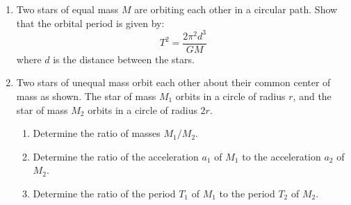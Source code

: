\documentclass{../../../oss-apphys}
\begin{document}
\begin{enumerate}[leftmargin=15pt]
\item Two stars of equal mass $M$ are orbiting each other in a circular path.
  Show that the orbital period is given by:
  \begin{displaymath}
    T^2=\frac{2\pi^2d^3}{GM}
  \end{displaymath}
  where $d$ is the distance between the stars.
  
\item Two stars of unequal mass orbit each other about their common center of
  mass as shown. The star of mass $M_1$ orbits in a circle of radius $r$, and
  the star of mass $M_2$ orbits in a circle of radius $2r$.
  \begin{center}
  \end{center}
  \begin{enumerate}[nosep]
  \item Determine the ratio of masses $M_1/M_2$.
  \item Determine the ratio of the acceleration $a_1$ of $M_1$ to the
    acceleration $a_2$ of $M_2$.
  \item Determine the ratio of the period $T_1$ of $M _1$ to the period $T_2$
    of $M_2$.
  \end{enumerate}
  \newpage


\end{enumerate}
\end{document}
